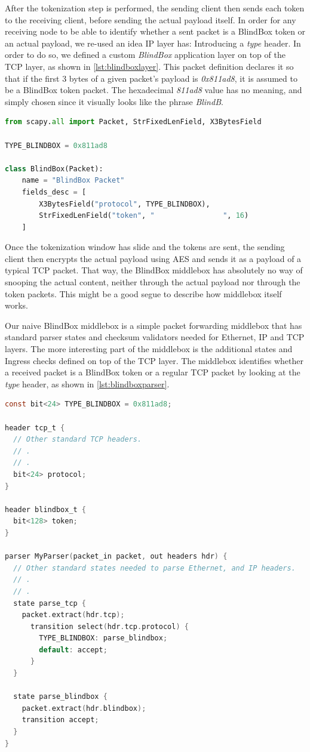 \documentclass{winslabreport}
\begin{document}
After the tokenization step is performed, the sending client then sends each token to the receiving client, before sending the actual payload itself. In order for any receiving node to be able to identify whether a sent packet is a BlindBox token or an actual payload, we re-used an idea IP layer has: Introducing a \emph{type} header. In order to do so, we defined a custom \emph{BlindBox} application layer on top of the TCP layer, as shown in \autoref{lst:blindboxlayer}. This packet definition declares it so that if the first 3 bytes of a given packet's payload is \emph{0x811ad8}, it is assumed to be a BlindBox token packet. The hexadecimal \emph{811ad8} value has no meaning, and simply chosen since it visually looks like the phrase \emph{BlindB}.

\begin{lstlisting}[caption={Layer Definition},label={lst:blindboxlayer},language=Python]
from scapy.all import Packet, StrFixedLenField, X3BytesField

TYPE_BLINDBOX = 0x811ad8

class BlindBox(Packet):
    name = "BlindBox Packet"
    fields_desc = [
        X3BytesField("protocol", TYPE_BLINDBOX),
        StrFixedLenField("token", "                ", 16)
    ]
\end{lstlisting}

Once the tokenization window has slide and the tokens are sent, the sending client then encrypts the actual payload using AES and sends it as a payload of a typical TCP packet. That way, the BlindBox middlebox has absolutely no way of snooping the actual content, neither through the actual payload nor through the token packets. This might be a good segue to describe how middlebox itself works.

Our naive BlindBox middlebox is a simple packet forwarding middlebox that has standard parser states and checksum validators needed for Ethernet, IP and TCP layers. The more interesting part of the middlebox is the additional states and Ingress checks defined on top of the TCP layer. The middlebox identifies whether a received packet is a BlindBox token or a regular TCP packet by looking at the \emph{type} header, as shown in \autoref{lst:blindboxparser}.

\begin{lstlisting}[caption={Middlebox Parser},label={lst:blindboxparser},language=C]
const bit<24> TYPE_BLINDBOX = 0x811ad8;

header tcp_t {
  // Other standard TCP headers.
  // .
  // .
  bit<24> protocol;
}

header blindbox_t {
  bit<128> token;
}

parser MyParser(packet_in packet, out headers hdr) {
  // Other standard states needed to parse Ethernet, and IP headers.
  // .
  // .
  state parse_tcp {
    packet.extract(hdr.tcp);
      transition select(hdr.tcp.protocol) {
        TYPE_BLINDBOX: parse_blindbox;
        default: accept;
      }
  }

  state parse_blindbox {
    packet.extract(hdr.blindbox);
    transition accept;
  }
}
\end{lstlisting}
\end{document}
